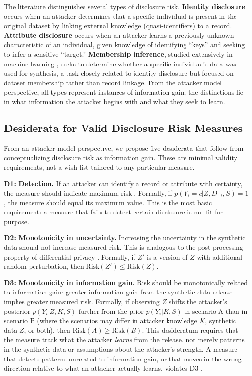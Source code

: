 \documentclass[Afour,sageh,times,doublespace]{sagej}
\begin{document}
The literature distinguishes several types of disclosure risk. \textbf{Identity disclosure} occurs when an attacker determines that a specific individual is present in the original dataset by linking external knowledge (quasi-identifiers) to a record. \textbf{Attribute disclosure} occurs when an attacker learns a previously unknown characteristic of an individual, given knowledge of identifying ``keys'' and seeking to infer a sensitive ``target.'' \textbf{Membership inference}, studied extensively in machine learning \citep{Shokri2017, Hayes2019, Stadler2022}, seeks to determine whether a specific individual's data was used for synthesis, a task closely related to identity disclosure but focused on dataset membership rather than record linkage. From the attacker model perspective, all types represent instances of information gain; the distinctions lie in what information the attacker begins with and what they seek to learn.

\subsection{Desiderata for Valid Disclosure Risk Measures}

From an attacker model perspective, we propose five desiderata that follow from conceptualizing disclosure risk as information gain. These are minimal validity requirements, not a wish list tailored to any particular measure.

\textbf{D1: Detection.} If an attacker can identify a record or attribute with certainty, the measure should indicate maximum risk \citep{DuncanLambert1986, DuncanLambert1989}. Formally, if $p(Y_i = c | Z, D_{-i}, S) = 1$, the measure should equal its maximum value. This is the most basic requirement: a measure that fails to detect certain disclosure is not fit for purpose.

\textbf{D2: Monotonicity in uncertainty.} Increasing the uncertainty in the synthetic data should not increase measured risk. This is analogous to the post-processing property of differential privacy \citep{Dwork2006}. Formally, if $Z'$ is a version of $Z$ with additional random perturbation, then $\text{Risk}(Z') \leq \text{Risk}(Z)$.

\textbf{D3: Monotonicity in information gain.} Risk should be monotonically related to information gain: greater information gain from the synthetic data release implies greater measured risk. Formally, if observing $Z$ shifts the attacker's posterior $p(Y_i | Z, K, S)$ further from the prior $p(Y_i | K, S)$ in scenario A than in scenario B (where the scenarios may differ in attacker knowledge $K$, synthetic data $Z$, or both), then $\text{Risk}(A) \geq \text{Risk}(B)$. This desideratum requires that the measure track what the attacker \textit{learns} from the release, not merely patterns in the synthetic data or assumptions about the attacker's strength. A measure that detects patterns unrelated to information gain, or that moves in the wrong direction relative to what an attacker actually learns, violates D3 \citep{DuncanLambert1989}.
\end{document}
